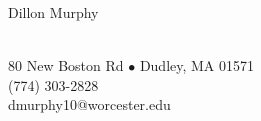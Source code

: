 \documentclass[12pt,notitlepage]{article}
\newenvironment{rhead}
	{\fontfamily{\sfdefault}\selectfont\centering}
	{\par}
\begin{document}
\begin{rhead}
	\begin{Large}Dillon Murphy\end{Large} \\
	80 New Boston Rd $\bullet$
	Dudley, MA 01571 \\
	(774) 303-2828 \\
	dmurphy10@worcester.edu
\end{rhead}
\hrulefill
\end{document}
